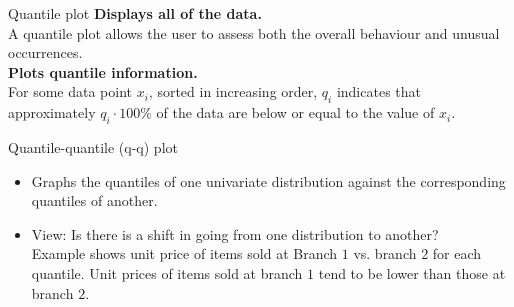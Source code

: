 \documentclass[aspectratio=169,t]{beamer}
\begin{document}
  { 
    \begin{frame}{Quantile plot}
    \textbf{Displays all of the data.}\\
    A quantile plot allows the user to assess both the overall behaviour and unusual occurrences.\\[0.5cm]
    \textbf{Plots quantile information.}\\
    For some data point $x_i$, sorted in increasing order, $q_i$ indicates that approximately $q_i \cdot 100 \%$ of the data are below or equal to the value of $x_i$.\\[0.2cm]
    \centering
    \end{frame}
  }

  { 
        \begin{frame}{Quantile-quantile (q-q) plot}
    \begin{itemize}
      \item Graphs the quantiles of one univariate distribution against the corresponding quantiles of another.
      \item View: Is there is a shift in going from one distribution to another?\\
      Example shows unit price of items sold at Branch $1$ vs. branch $2$ for each quantile.  Unit prices of items sold at branch $1$ tend to be lower than those at branch $2$.
    \end{itemize}\vspace{0.5cm}
    \centering
    \end{frame}
  }
\end{document}
